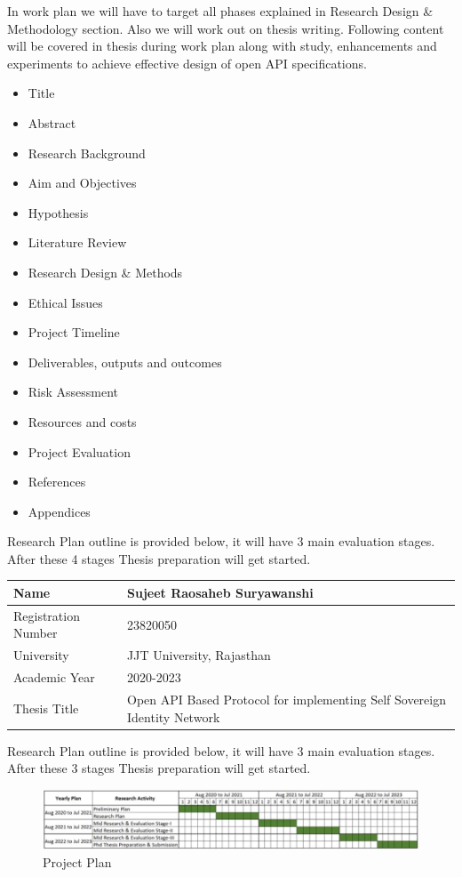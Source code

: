 In work plan we will have to target all phases explained in Research Design & Methodology section. Also we will work out on thesis writing. Following content will be covered in thesis during work plan along with study, enhancements and experiments  to achieve effective design of open API specifications. 
\begin{itemize}
    \item Title
    \item Abstract
    \item Research Background
    \item Aim and Objectives
    \item Hypothesis
    \item Literature Review
    \item Research Design & Methods
    \item Ethical Issues
    \item Project Timeline
    \item Deliverables, outputs and outcomes
    \item Risk Assessment
    \item Resources and costs
    \item Project Evaluation
    \item References
    \item Appendices
\end{itemize}
Research Plan outline is provided below, it will have 3 main evaluation stages. After these 4 stages Thesis preparation will get started. 
    \begin{center}
    \begin{tabular}{ | m{5em} | m{25em} |} 
      \hline
      Name & Sujeet Raosaheb Suryawanshi \\ 
      \hline
      Registration Number & 23820050 \\ 
      \hline
      University & JJT University, Rajasthan \\ 
      \hline
      Academic Year & 2020-2023 \\ 
      \hline
      Thesis Title & Open API Based Protocol for implementing Self Sovereign Identity Network
      \\ 
      \hline
    \end{tabular}
    \end{center}
Research Plan outline is provided below, it will have 3 main evaluation stages. After these 3 stages Thesis preparation will get started. 
\begin{figure}
        
        \includegraphics[width=15cm]{images/Project Plan.jpg}
        \centering
        \caption{Project Plan}
        \label{fig:my_label}
    \end{figure}

